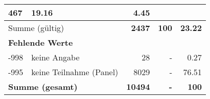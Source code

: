 \begin{longtable}{lXrrr}
       \num{467} &
       \num[round-mode=places,round-precision=2]{19.16} &
         \num[round-mode=places,round-precision=2]{4.45} \\
     \midrule
     \multicolumn{2}{l}{Summe (gültig)} &
       \textbf{\num{2437}} &
     \textbf{\num{100}} &
       \textbf{\num[round-mode=places,round-precision=2]{23.22}} \\
     \multicolumn{5}{l}{\textbf{Fehlende Werte}}\\
       -998 &
       keine Angabe &
         \num{28} &
        - &
         \num[round-mode=places,round-precision=2]{0.27} \\
       -995 &
       keine Teilnahme (Panel) &
         \num{8029} &
        - &
         \num[round-mode=places,round-precision=2]{76.51} \\
     \midrule
     \multicolumn{2}{l}{\textbf{Summe (gesamt)}} &
          \textbf{\num{10494}} &
        \textbf{-} &
        \textbf{\num{100}} \\
     \bottomrule
     \end{longtable}
     
